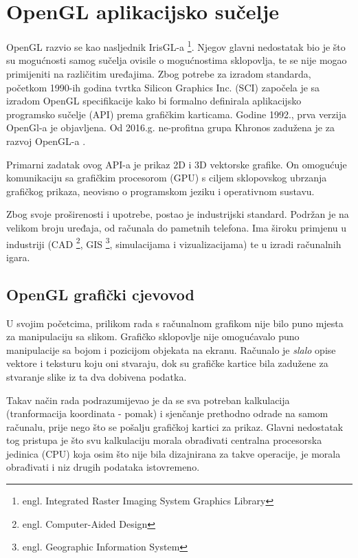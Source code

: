\section{OpenGL aplikacijsko sučelje}

OpenGL razvio se kao nasljednik IrisGL-a \footnote{engl. Integrated Raster Imaging System Graphics Library}. Njegov glavni nedostatak bio je što su mogućnosti samog sučelja ovisile o mogućnostima sklopovlja, te se nije mogao primijeniti na različitim uređajima. Zbog potrebe za izradom standarda, početkom 1990-ih godina tvrtka Silicon Graphics Inc. (SCI) započela je sa izradom OpenGL specifikacije kako bi formalno definirala aplikacijsko programsko sučelje (API) prema grafičkim karticama. Godine 1992., prva verzija OpenGl-a je objavljena. Od 2016.g. ne-profitna grupa Khronos zadužena je za razvoj OpenGL-a \cite{opengl-wiki-hostory}.

Primarni zadatak ovog API-a je prikaz 2D i 3D vektorske grafike. On omogućuje komunikaciju sa grafičkim procesorom (GPU) s ciljem sklopovskog ubrzanja grafičkog prikaza, neovisno o programskom jeziku i operativnom sustavu.

Zbog svoje proširenosti i upotrebe, postao je industrijski standard. Podržan je na velikom broju uređaja, od računala do pametnih telefona. Ima široku primjenu u industriji (CAD \footnote{engl. Computer-Aided Design}, GIS \footnote{engl. Geographic Information System}, simulacijama i vizualizacijama) te u izradi računalnih igara.

\subsection{OpenGL grafički cjevovod}

U svojim početcima, prilikom rada s računalnom grafikom nije bilo puno mjesta za manipulaciju sa slikom. Grafičko sklopovlje nije omogućavalo puno manipulacije sa bojom i pozicijom objekata na ekranu. Računalo je \emph{slalo} opise vektore i teksturu koju oni stvaraju, dok su grafičke kartice bila zadužene za stvaranje slike iz ta dva dobivena podatka.

Takav način rada podrazumijevao je da se sva potreban kalkulacija (tranformacija koordinata - pomak) i sjenčanje prethodno odrade na samom računalu, prije nego što se pošalju grafičkoj kartici za prikaz. Glavni nedostatak tog pristupa je što svu kalkulaciju morala obrađivati centralna procesorska jedinica (CPU) koja osim što nije bila dizajnirana za takve operacije, je morala obrađivati i niz drugih podataka istovremeno.

